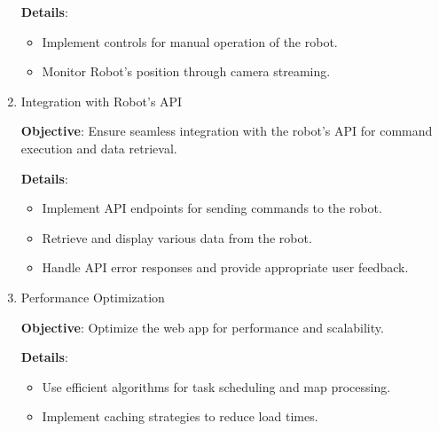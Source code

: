 \begin{enumerate}
        \vspace{-1.5mm}
        \textbf{Details}:
        \begin{itemize}
            \vspace{-1mm}
            \item Implement controls for manual operation of the robot.
            \vspace{-1mm}
            \item Monitor Robot's position through camera streaming.
        \end{itemize}


    \item Integration with Robot’s API
        
        \vspace{-1.5mm}
        \textbf{Objective}: Ensure seamless integration with the robot’s API for command execution and data retrieval.

        \vspace{-1.5mm}
        \textbf{Details}:
        \begin{itemize}
            \vspace{-1mm}
            \item Implement API endpoints for sending commands to the robot.
            \vspace{-1mm}
            \item Retrieve and display various data from the robot.
            \vspace{-1mm}
            \item Handle API error responses and provide appropriate user feedback.
        \end{itemize}





    \item Performance Optimization
        
        \vspace{-1.5mm}
        \textbf{Objective}: Optimize the web app for performance and scalability.

        \vspace{-1.5mm}
        \textbf{Details}:
        \begin{itemize}
            \vspace{-1mm}
            \item Use efficient algorithms for task scheduling and map processing.
            \vspace{-1mm}
            \item Implement caching strategies to reduce load times.
        \end{itemize}
\end{enumerate}


